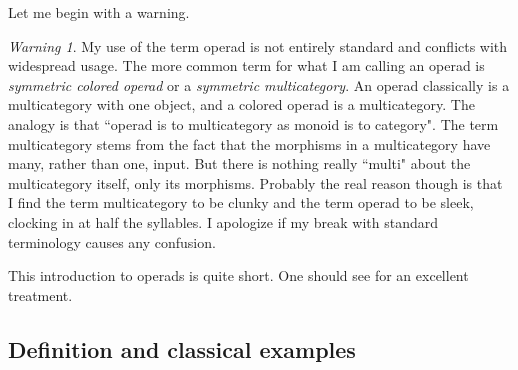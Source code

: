 \documentclass{book}
\theoremstyle{remark}
\newtheorem{warning}[subsubsection]{Warning}
\theoremstyle{definition}
\begin{document}
Let me begin with a warning.

\begin{warning}

My use of the term operad is not entirely standard and conflicts with widespread usage. The more common term for what I am calling an operad is {\em symmetric colored operad} or a {\em symmetric multicategory}. An operad classically is a multicategory with one object, and a colored operad is a multicategory. The analogy is that ``operad is to multicategory as monoid is to category". The term multicategory stems from the fact that the morphisms in a multicategory have many, rather than one, input. But there is nothing really ``multi" about the multicategory itself, only its morphisms. Probably the real reason though is that I find the term multicategory to be clunky and the term operad to be sleek, clocking in at half the syllables. I apologize if my break with standard terminology causes any confusion.  

\end{warning}

This introduction to operads is quite short. One should see \cite{Le1} for an excellent treatment.


\subsection{Definition and classical examples}
\end{document}
